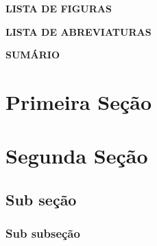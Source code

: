 \documentclass[12pt,a4paper]{article}
\begin{document}
\begin{center}
     \Large\textbf{\MakeUppercase{Lista de Figuras}}
\end{center}
\vspace*{3\baselineskip}
\renewcommand{\listfigurename}{}
\listoffigures
\thispagestyle{empty}
\newpage

\begin{center}
     \Large\textbf{\MakeUppercase{Lista de Abreviaturas}}
\end{center}
\vspace*{3\baselineskip}
\printnoidxglossary[style=custom, type=acronym, title={}, toctitle={Lista de Abreviaturas}]
\thispagestyle{empty}
\newpage

\begin{center}
    \vspace*{3cm}
    \Large\textbf{\MakeUppercase{Sumário}}
\end{center}
\vspace*{3\baselineskip}

\tableofcontents
\thispagestyle{empty}
\newpage

\setlength{\parindent}{1.25cm} %
\onehalfspacing %

\section{Primeira Seção}

\lipsum[1-2]

\section{Segunda Seção}

\lipsum[3-4]

\subsection{Sub seção}
\lipsum[5-6]

\subsubsection{Sub subseção}
\lipsum[5-6]
\end{document}
